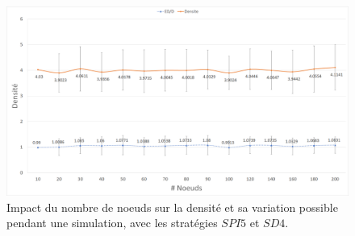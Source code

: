 \documentclass[a4paper]{article}
\begin{document}
\begin{figure}[H]
\begin{minipage}{\textwidth}
  \centering
    \includegraphics[width=\textwidth]{images/ex2.png}
    \caption{Impact du nombre de noeuds sur la densité et sa variation possible
      pendant une simulation, avec les stratégies $SPI5$ et $SD4$.}
\end{minipage}
\end{figure}
\end{document}
